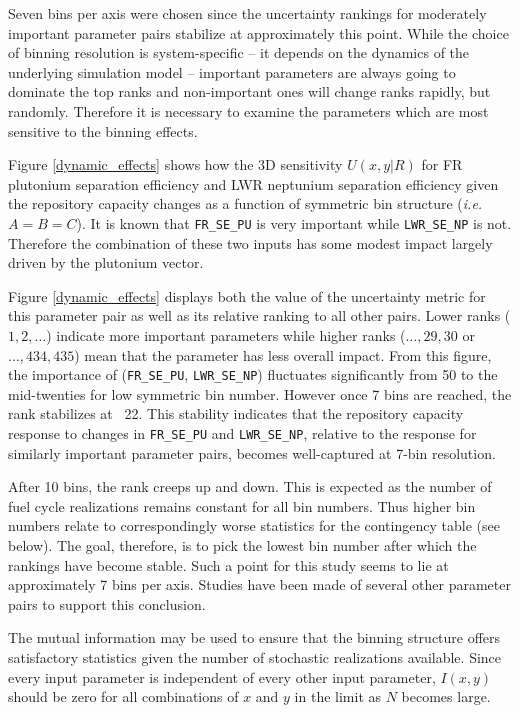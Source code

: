 Seven bins per axis were chosen since the uncertainty rankings for moderately important 
parameter pairs stabilize at approximately this point.  While the choice of binning 
resolution is system-specific -- it depends on the dynamics of the underlying 
simulation model -- important parameters are always going to dominate the top 
ranks and non-important ones will change ranks rapidly, but randomly.  Therefore 
it is necessary  to examine the parameters which are most sensitive to the binning effects.

Figure \ref{dynamic_effects} shows how the 3D sensitivity $U(x,y|R)$ for FR 
plutonium separation efficiency and LWR neptunium separation efficiency given the repository
capacity changes as a function of symmetric bin structure (\emph{i.e.} $A=B=C$).  
It is known that \texttt{FR\_SE\_PU} is very important
while \texttt{LWR\_SE\_NP} is not.  Therefore the combination of these two inputs 
has some modest impact largely driven by the plutonium vector.

Figure \ref{dynamic_effects} displays both the value of the uncertainty metric 
for this parameter pair as well as its relative ranking to all other pairs.
Lower ranks ($1, 2, \ldots$) indicate more important parameters while higher 
ranks ($\ldots, 29, 30$ or $\ldots, 434, 435$) mean that the parameter has less overall
impact.  From this figure, the importance of (\texttt{FR\_SE\_PU}, \texttt{LWR\_SE\_NP}) 
fluctuates significantly from 50 to the mid-twenties for low symmetric
bin number.  However once 7 bins are reached, the rank stabilizes at ~22.  This stability 
indicates that the repository capacity response to changes in \texttt{FR\_SE\_PU} and 
\texttt{LWR\_SE\_NP}, relative to the response for similarly important parameter pairs, 
becomes well-captured at 7-bin resolution.

After 10 bins, the rank creeps up and down.  This is expected as the number of
fuel cycle realizations remains constant for all bin numbers.  Thus higher bin numbers 
relate to correspondingly worse statistics for the contingency table (see below).  
The goal, therefore, is to pick the lowest bin number after which the rankings have 
become stable.  Such a point for this study seems to lie at approximately
7 bins per axis.  Studies have been made of several other parameter pairs to support this conclusion.

The mutual information may be used to ensure that the binning structure offers 
satisfactory statistics given the number of stochastic realizations available.  
Since every input parameter is independent of every other input parameter, $I(x,y)$ 
should be zero for all combinations of $x$ and $y$
in the limit as $N$ becomes large.

